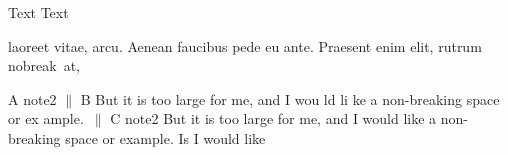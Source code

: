 \documentclass{report}
\begin{document}
\lipsum[1-3] \lipsum[4-6]

Text Text

\noindent
laoreet vitae, arcu. Aenean faucibus pede eu ante. Praesent enim elit, rutrum nobreak\  at,

\footnotesize
\noindent A note2
$\parallel$ B But it is too large for me, and I wou ld li ke a non-breaking space or ex ample.\nobreak\ $\parallel$ C note2 But it is too large for me, and I would like a non-breaking space or example. Is I
would like
\end{document}
